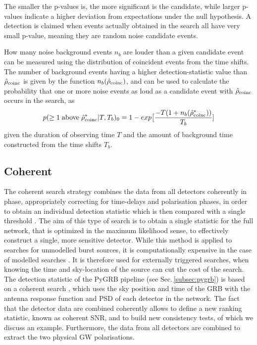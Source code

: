 \documentclass[binding=0.6cm, LaM]{sapthesis}
\begin{document}
	The smaller the p-values is, the more significant is the candidate,
	while larger p-values indicate a higher deviation from expectations under the null hypothesis.
	A detection is claimed when events actually obtained in the search all have very small p-value,
	meaning they are random noise candidate events.

	How many noise background events $n_b$ are louder than a given candidate event
	can be measured using the distribution of coincident events from the time shifts.
	The number of background events having a higher detection-statistic value than $\hat{\rho}_{\rm coinc}$
	is given by the function $n_b(\hat{\rho}_{\rm coinc})$, and can be used to calculate 
	the probability that one or more noise events as loud as a candidate event with $\hat{\rho}_{\rm coinc}$
	occurs in the search, as 
        \begin{equation}
          p(\geq 1 \hspace*{0.1cm}\text{above}\hspace*{0.1cm} \hat{\rho}_{\rm coinc}^*|T,T_b)_0 = 1 - exp\big[ {{-T(1+n_b(\hat{\rho}_{\rm coinc}^*))} \over {T_b}}]
        \end{equation}
	 given the duration of observing time $T$ and the amount of background time 
	constructed from the time shifts $T_b$. \cite{28}

\subsection{Coherent}
\label{subsec:coherent}
	The coherent search strategy combines the data from all detectors coherently in phase, 
	appropriately correcting for time-delays and polarisation phases, in order
	to obtain an individual detection statistic which is then compared with a single threshold \cite{18}. 
	The aim of this type of search is to obtain a single statistic for the full 
	network, that is optimized in the maximum likelihood sense, 
	to effectively construct a single, more sensitive detector.
 	While this method is applied to searches for unmodelled burst sources,
        it is computationally expensive in the case of modelled searches \cite{45}.  
	It is therefore used for externally triggered searches, 
	when knowing the time and sky-location of the source can cut the cost of the search.
	The detection statistic of the {\ttfamily PyGRB} pipeline (see Sec.\,\ref{subsec:pygrb}) 
	is based on a coherent search \cite{46, 92},
	which uses the sky position and time of the GRB with the antenna response function and PSD of each detector in the network. 
        The fact that the detector data are combined coherently allows to define a new ranking statistic, 
	known as coherent SNR, and to build new consistency tests, of which we discuss an example.
	Furthermore, the data from all detectors are combined to extract the two physical GW polarisations. 
\end{document}
